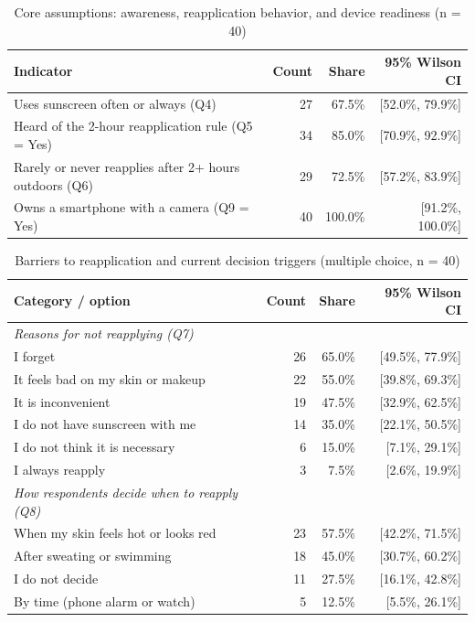 \begin{table}[ht]\centering\small\caption{Core assumptions: awareness, reapplication behavior, and device readiness (n = 40)}\label{tab:svy-core}
\begin{tabular}{@{}L{6.2cm}rrr@{}}\toprule
\textbf{Indicator} & \textbf{Count} & \textbf{Share} & \textbf{95\% Wilson CI}\\\midrule
Uses sunscreen often or always (Q4) & 27 & 67.5\% & [52.0\%, 79.9\%]\\
Heard of the 2-hour reapplication rule (Q5 = Yes) & 34 & 85.0\% & [70.9\%, 92.9\%]\\
Rarely or never reapplies after 2+ hours outdoors (Q6) & 29 & 72.5\% & [57.2\%, 83.9\%]\\
Owns a smartphone with a camera (Q9 = Yes) & 40 & 100.0\% & [91.2\%, 100.0\%]\\
\bottomrule\end{tabular}\end{table}

\begin{table}[ht]\centering\small\caption{Barriers to reapplication and current decision triggers (multiple choice, n = 40)}\label{tab:svy-barriers}
\begin{tabular}{@{}L{6.2cm}rrr@{}}\toprule
\textbf{Category / option} & \textbf{Count} & \textbf{Share} & \textbf{95\% Wilson CI}\\\midrule
\emph{Reasons for not reapplying (Q7)} &  &  & \\
I forget & 26 & 65.0\% & [49.5\%, 77.9\%]\\
It feels bad on my skin or makeup & 22 & 55.0\% & [39.8\%, 69.3\%]\\
It is inconvenient & 19 & 47.5\% & [32.9\%, 62.5\%]\\
I do not have sunscreen with me & 14 & 35.0\% & [22.1\%, 50.5\%]\\
I do not think it is necessary & 6 & 15.0\% & [7.1\%, 29.1\%]\\
I always reapply & 3 & 7.5\% & [2.6\%, 19.9\%]\\
\emph{How respondents decide when to reapply (Q8)} &  &  & \\
When my skin feels hot or looks red & 23 & 57.5\% & [42.2\%, 71.5\%]\\
After sweating or swimming & 18 & 45.0\% & [30.7\%, 60.2\%]\\
I do not decide & 11 & 27.5\% & [16.1\%, 42.8\%]\\
By time (phone alarm or watch) & 5 & 12.5\% & [5.5\%, 26.1\%]\\
\bottomrule\end{tabular}\end{table}

